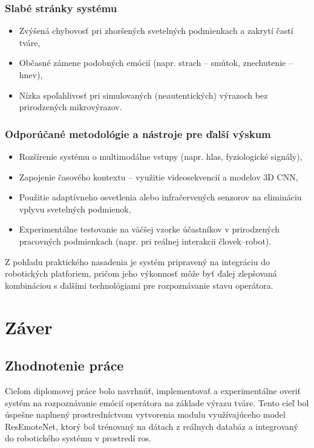 \subsubsection{Slabé stránky systému}
\begin{itemize}
  \item Zvýšená chybovosť pri zhoršených svetelných podmienkach a zakrytí častí tváre,
  \item Občasné zámene podobných emócií (napr. strach -- smútok, znechutenie -- hnev),
  \item Nízka spoľahlivosť pri simulovaných (neautentických) výrazoch bez prirodzených mikrovýrazov.
\end{itemize}

\subsubsection{Odporúčané metodológie a nástroje pre ďalší výskum}
\begin{itemize}
  \item Rozšírenie systému o multimodálne vstupy (napr. hlas, fyziologické signály),
  \item Zapojenie časového kontextu – využitie videosekvencií a modelov 3D CNN,
  \item Použitie adaptívneho osvetlenia alebo infračervených senzorov na elimináciu vplyvu svetelných podmienok,
  \item Experimentálne testovanie na väčšej vzorke účastníkov v prirodzených pracovných podmienkach (napr. pri reálnej interakcii človek--robot).
\end{itemize}

Z pohľadu praktického nasadenia je systém pripravený na integráciu do robotických platforiem, pričom jeho výkonnosť môže byť ďalej zlepšovaná kombináciou s ďalšími technológiami pre rozpoznávanie stavu operátora.

\section{Záver}
\label{sec:conclusion}
\subsection{Zhodnotenie práce}

Cieľom diplomovej práce bolo navrhnúť, implementovať a experimentálne overiť systém na rozpoznávanie emócií operátora na základe výrazu tváre. Tento cieľ bol úspešne naplnený prostredníctvom vytvorenia modulu využívajúceho model ResEmoteNet, ktorý bol trénovaný na dátach z reálnych databáz a integrovaný do robotického systému v prostredí \gls{ros}.

